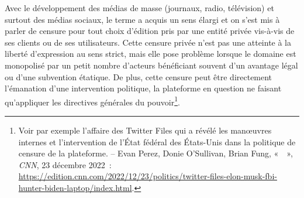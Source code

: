 Avec le développement des médias de masse (journaux, radio, télévision) et surtout des médias sociaux, le terme a acquis un sens élargi et on s'est mis à parler de censure pour tout choix d'édition pris par une entité privée vis-à-vis de ses clients ou de ses utilisateurs. Cette censure privée n'est pas une atteinte à la liberté d'expression au sens strict, mais elle pose problème lorsque le domaine est monopolisé par un petit nombre d'acteurs bénéficiant souvent d'un avantage légal ou d'une subvention étatique. De plus, cette censure peut être directement l'émanation d'une intervention politique, la plateforme en question ne faisant qu'appliquer les directives générales du pouvoir\footnote{Voir par exemple l'affaire des Twitter Files qui a révélé les manœuvres internes et l'intervention de l'État fédéral des États-Unis dans la politique de censure de la plateforme. -- Evan Perez, Donie O'Sullivan, Brian Fung, «~~», \emph{CNN}, 23 décembre 2022~: \url{https://edition.cnn.com/2022/12/23/politics/twitter-files-elon-musk-fbi-hunter-biden-laptop/index.html}.}. %

